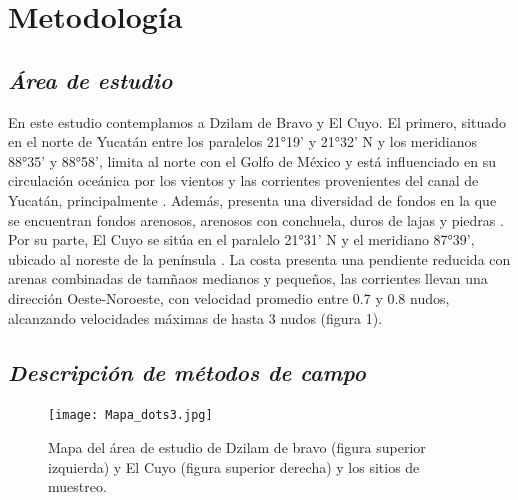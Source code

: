 \documentclass[
  authoryear,
  preprint,
  3p,
  twocolumn]{elsarticle}
\begin{document}
\hypertarget{metodologuxeda}{%
\section{Metodología}\label{metodologuxeda}}

\hypertarget{uxe1rea-de-estudio}{%
\subsection{\texorpdfstring{\emph{Área de
estudio}}{Área de estudio}}\label{uxe1rea-de-estudio}}

En este estudio contemplamos a Dzilam de Bravo y El Cuyo. El primero,
situado en el norte de Yucatán entre los paralelos 21°19' y 21°32' N y
los meridianos 88°35' y 88°58', limita al norte con el Golfo de México y
está influenciado en su circulación oceánica por los vientos y las
corrientes provenientes del canal de Yucatán, principalmente
\citep{1834/36164}. Además, presenta una diversidad de fondos en la que
se encuentran fondos arenosos, arenosos con conchuela, duros de lajas y
piedras \citep{1834/36164}. Por su parte, El Cuyo se sitúa en el
paralelo 21°31' N y el meridiano 87°39', ubicado al noreste de la
península \citep{cnarioCuyo}. La costa presenta una pendiente reducida
con arenas combinadas de tamñaos medianos y pequeños, las corrientes
llevan una dirección Oeste-Noroeste, con velocidad promedio entre 0.7 y
0.8 nudos, alcanzando velocidades máximas de hasta 3 nudos
\citep{cnarioCuyo} (figura 1).

\hypertarget{descripciuxf3n-de-muxe9todos-de-campo}{%
\subsection{\texorpdfstring{\emph{Descripción de métodos de
campo}}{Descripción de métodos de campo}}\label{descripciuxf3n-de-muxe9todos-de-campo}}

\begin{figure}

{\centering \texttt{[image: Mapa\_dots3.jpg]}

}

\caption{Mapa del área de estudio de Dzilam de bravo (figura superior
izquierda) y El Cuyo (figura superior derecha) y los sitios de
muestreo.}

\end{figure}
\end{document}
